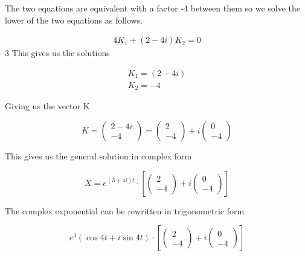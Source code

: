 \documentclass[a4paper]{article}
\begin{document}
The two equations are equivalent with a factor -4 between them so we solve the lower of the two equations as follows.

\begin{align}
    4K_1 + (2-4i)K_2 = 0
\end{align}
3
This gives us the solutions

\begin{align}
    K_1 = (2-4i) \\
    K_2 = -4
\end{align}

Giving us the vector K

\begin{equation}
    K = 
    \begin{pmatrix}
        2-4i \\
        -4
    \end{pmatrix}
    = 
    \begin{pmatrix}
        2 \\
        -4
    \end{pmatrix}
    +
    i
    \begin{pmatrix}
        0 \\
        -4
    \end{pmatrix}
\end{equation}

This gives us the general solution in complex form

\begin{equation}
    X = e^{(3+4i)t} \cdot 
    \left[
        \begin{pmatrix}
            2 \\
            -4
        \end{pmatrix}
        +
        i
        \begin{pmatrix}
            0 \\
            -4
        \end{pmatrix}
    \right]
\end{equation}

The complex exponential can be rewritten in trigonometric form

\begin{equation}
    e^3(\cos4t + i\sin4t) \cdot 
    \left[
        \begin{pmatrix}
            2 \\
            -4
        \end{pmatrix}
        +
        i
        \begin{pmatrix}
            0 \\
            -4
        \end{pmatrix}
    \right]
\end{equation}
\end{document}
